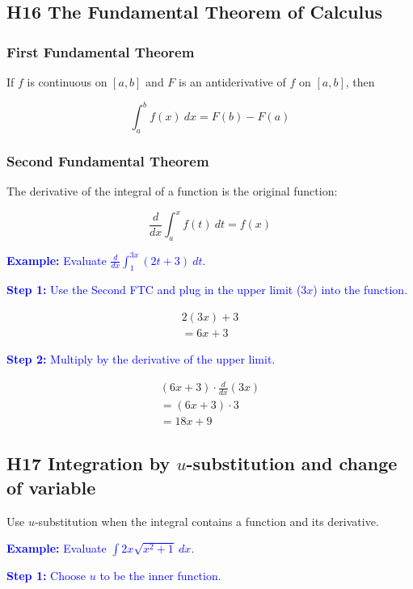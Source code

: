 \documentclass[letterpaper, 12pt]{article}
\newcommand{\example}[1]{\textcolor{blue}{\textbf{Example:} #1}}
\newcommand{\step}[2]{\textcolor{blue}{\textbf{Step #1:} #2}}
\begin{document}
\subsection*{H16 The Fundamental Theorem of Calculus}

\subsubsection*{First Fundamental Theorem}

If $f$ is continuous on $[a, b]$ and $F$ is an antiderivative of $f$ on $[a, b]$, then

$$\int_{a}^{b} f(x) \: dx = F(b) - F(a)$$

\subsubsection*{Second Fundamental Theorem}

The derivative of the integral of a function is the original function:

$$\frac{d}{dx} \int_{a}^{x} f(t) \: dt = f(x)$$

\example{Evaluate $\displaystyle \frac{d}{dx} \int_{1}^{3x} (2t + 3) \: dt$.}

\step{1}{Use the Second FTC and plug in the upper limit ($3x$) into the function.}

\begin{gather*}
2(3x)+3 \\
= 6x + 3
\end{gather*}

\step{2}{Multiply by the derivative of the upper limit.}

\begin{gather*}
(6x + 3) \cdot \frac{d}{dx}(3x) \\
= (6x + 3) \cdot 3 \\
= \boxed{18x + 9}
\end{gather*}

\subsection*{H17 Integration by $u$-substitution and change of variable}

Use $u$-substitution when the integral contains a function and its derivative.

\example{Evaluate $\displaystyle \int 2x \sqrt{x^2 + 1} \: dx$.}

\step{1}{Choose $u$ to be the inner function.}
\end{document}

